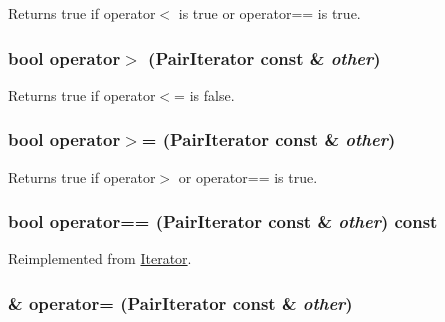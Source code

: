 Returns true if operator$<$ is true or operator== is true. \hypertarget{classJKBuilder_1_1PairIterator_ab37a738406950a5e19931f4c09b41f29}{
\subsubsection[{operator$>$}]{\setlength{\rightskip}{0pt plus 5cm}bool operator$>$ ({\bf PairIterator} const \& {\em other})}}
\label{classJKBuilder_1_1PairIterator_ab37a738406950a5e19931f4c09b41f29}


Returns true if operator$<$= is false. \hypertarget{classJKBuilder_1_1PairIterator_a0064337d38b8f97d0367be2e9bd31d62}{
\subsubsection[{operator$>$=}]{\setlength{\rightskip}{0pt plus 5cm}bool operator$>$= ({\bf PairIterator} const \& {\em other})}}
\label{classJKBuilder_1_1PairIterator_a0064337d38b8f97d0367be2e9bd31d62}


Returns true if operator$>$ or operator== is true. \hypertarget{classJKBuilder_1_1PairIterator_a6b4e430066f478e5e400edd39ef93968}{
\subsubsection[{operator==}]{\setlength{\rightskip}{0pt plus 5cm}bool operator== ({\bf PairIterator} const \& {\em other}) const}}
\label{classJKBuilder_1_1PairIterator_a6b4e430066f478e5e400edd39ef93968}


Reimplemented from \hyperlink{classJKBuilder_1_1Iterator_a1ea001976a5bc8ae8dc365e2a912b59a}{Iterator}.\hypertarget{classJKBuilder_1_1PairIterator_a698aa7b3d6495bd74dcff5b93be868a8}{
\subsubsection[{operator=}]{ \& operator= ({\bf PairIterator} const \& {\em other})}}
\label{classJKBuilder_1_1PairIterator_a698aa7b3d6495bd74dcff5b93be868a8}


